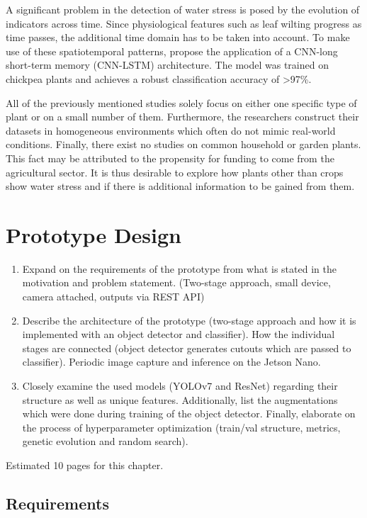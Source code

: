 \documentclass[draft,final]{vutinfth} %
\begin{document}
A significant problem in the detection of water stress is posed by the
evolution of indicators across time. Since physiological features such
as leaf wilting progress as time passes, the additional time domain
has to be taken into account. To make use of these spatiotemporal
patterns, \textcite{azimi2021} propose the application of a CNN-long
short-term memory (CNN-LSTM) architecture. The model was trained on
chickpea plants and achieves a robust classification accuracy of
>97\%.

All of the previously mentioned studies solely focus on either one
specific type of plant or on a small number of them. Furthermore, the
researchers construct their datasets in homogeneous environments which
often do not mimic real-world conditions. Finally, there exist no
studies on common household or garden plants. This fact may be
attributed to the propensity for funding to come from the agricultural
sector. It is thus desirable to explore how plants other than crops
show water stress and if there is additional information to be gained
from them.

\chapter{Prototype Design}
\label{chap:design}

\begin{enumerate}
\item Expand on the requirements of the prototype from what is stated
  in the motivation and problem statement. (Two-stage approach, small
  device, camera attached, outputs via REST API)
\item Describe the architecture of the prototype (two-stage approach
  and how it is implemented with an object detector and
  classifier). How the individual stages are connected (object
  detector generates cutouts which are passed to classifier). Periodic
  image capture and inference on the Jetson Nano.
\item Closely examine the used models (YOLOv7 and ResNet) regarding
  their structure as well as unique features. Additionally, list the
  augmentations which were done during training of the object
  detector. Finally, elaborate on the process of hyperparameter
  optimization (train/val structure, metrics, genetic evolution and
  random search).
\end{enumerate}

Estimated 10 pages for this chapter.

\section{Requirements}
\label{sec:requirements}
\end{document}
